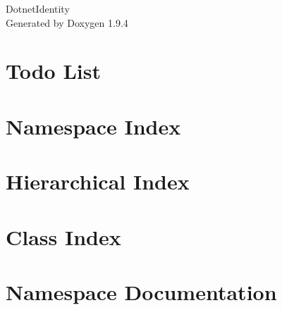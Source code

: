\documentclass[twoside]{book}
\newcommand{\+}{\discretionary{\mbox{\scriptsize$\hookleftarrow$}}{}{}}
\newcommand{\clearemptydoublepage}{%
    \newpage{\pagestyle{empty}\cleardoublepage}%
  }
\begin{document}
  \raggedbottom
    \hypersetup{pageanchor=false,
                bookmarksnumbered=true,
                pdfencoding=unicode
               }
  \begin{titlepage}
  \vspace*{7cm}
  \begin{center}%
  {\Large Dotnet\+Identity}\\
  \vspace*{1cm}
  {\large Generated by Doxygen 1.9.4}\\
  \end{center}
  \end{titlepage}
  \clearemptydoublepage
  \tableofcontents
  \clearemptydoublepage
  \hypersetup{pageanchor=true}
\chapter{Todo List}
\label{todo}

\chapter{Namespace Index}

\chapter{Hierarchical Index}

\chapter{Class Index}

\chapter{Namespace Documentation}















\end{document}

